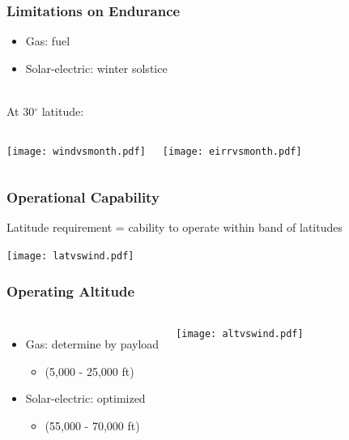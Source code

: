 \documentclass{beamer}
\begin{document}
\begin{frame}
    \frametitle{Limitations on Endurance}

    \begin{itemize}
        \item Gas: fuel 
        \item Solar-electric: winter solstice \\~\\
    \end{itemize}

    
    At 30$^{\circ}$ latitude:
    \begin{columns}
        \texttt{[image: windvsmonth.pdf]}
        
        \texttt{[image: eirrvsmonth.pdf]}
    \end{columns}

\end{frame}

\begin{frame}
    \frametitle{Operational Capability}

    Latitude requirement = cability to operate within band of latitudes

    \texttt{[image: latvswind.pdf]}

\end{frame}

\begin{frame}
    \frametitle{Operating Altitude}
    
    \begin{columns}
        \begin{itemize}
            \item Gas: determine by payload
                \begin{itemize}
                    \item (5,000 - 25,000 ft)
                    \end{itemize}
            \item Solar-electric: optimized 
                \begin{itemize}
                    \item (55,000 - 70,000 ft)
                    \end{itemize}
                \end{itemize}
        
        \texttt{[image: altvswind.pdf]}
    \end{columns}

\end{frame}
\end{document}
